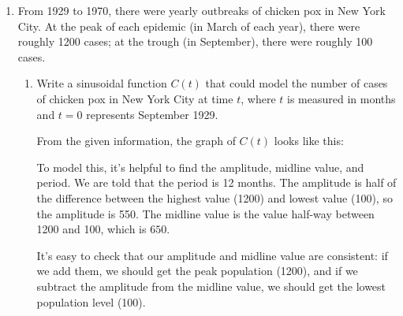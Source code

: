 \documentclass{article}
\begin{document}
\begin{enumerate}
\begin{enumerate}[resume]
  \end{enumerate}  

  \probonly{\newpage}

\item \label{spring2011-final-10-chicken-pox-expanded}

From 1929 to 1970, there were yearly outbreaks of chicken pox in New
  York City.  At the peak of each epidemic (in March of each year), there
  were roughly 1200 cases; at the trough (in September), there were
  roughly 100 cases.  

  \begin{enumerate}
  \item \label{spring2011-final-10-chicken-pox-expanded-model}
    \begin{problem}[\vfill]
      Write a sinusoidal function $C(t)$ that could model the number of
      cases of chicken pox in New York City at time $t$, where $t$ is
      measured in months and $t = 0$ represents September 1929.
    \end{problem}

    \begin{solution}
      From the given information, the graph of $C(t)$ looks like this:
      \begin{center}
      \end{center}
      To model this, it's helpful to find the amplitude, midline value,
      and period.  We are told that the period is 12 months.  The
      amplitude is half of the difference between the highest value (1200)
      and lowest value (100), so the amplitude is 550.  The midline value
      is the value half-way between 1200 and 100, which is $650$.

      \begin{checkanswer}
        It's easy to check that our amplitude and midline value are
        consistent: if we add them, we should get the peak population
        (1200), and if we subtract the amplitude from the midline value,
        we should get the lowest population level (100).
      \end{checkanswer}


\end{solution}
\end{enumerate}
\end{enumerate}
\end{document}
